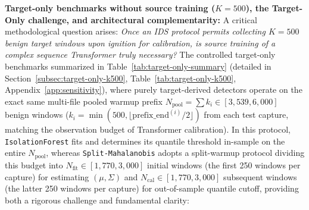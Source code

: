 \documentclass[12pt, a4paper, reqno, oneside]{book}
\DeclareRobustCommand{\code}[1]{\nolinkurl{#1}}
\begin{document}
\noindent\textbf{Target-only benchmarks without source training ($K=500$), the Target-Only challenge, and architectural complementarity:} A critical methodological question arises: \textit{Once an IDS protocol permits collecting $K=500$ benign target windows upon ignition for calibration, is source training of a complex sequence Transformer truly necessary?} The controlled target-only benchmarks summarized in Table~\ref{tab:target-only-summary} (detailed in Section~\ref{subsec:target-only-k500}, Table~\ref{tab:target-only-k500}, Appendix~\ref{app:sensitivity}), where purely target-derived detectors operate on the exact same multi-file pooled warmup prefix $N_{\text{pool}} = \sum k_i \in [3{,}539, 6{,}000]$ benign windows ($k_i = \min(500, \lfloor\mathrm{prefix\_end}^{(i)}/2\rfloor)$ from each test capture, matching the observation budget of Transformer calibration). In this protocol, \code{IsolationForest} fits and determines its quantile threshold in-sample on the entire $N_{\text{pool}}$, whereas \code{Split-Mahalanobis} adopts a split-warmup protocol dividing this budget into $N_{\text{fit}} \in [1{,}770, 3{,}000]$ initial windows (the first 250 windows per capture) for estimating $(\mu, \Sigma)$ and $N_{\text{cal}} \in [1{,}770, 3{,}000]$ subsequent windows (the latter 250 windows per capture) for out-of-sample quantile cutoff, providing both a rigorous challenge and fundamental clarity:
\end{document}
